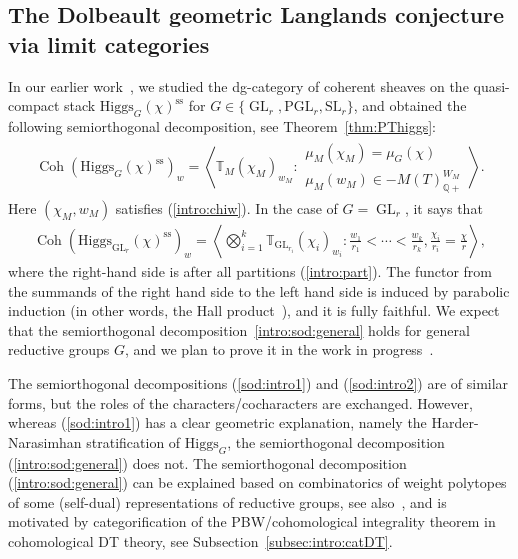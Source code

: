 \documentclass [11pt,oneside,a4paper,mathscr]{amsart}
\theoremstyle{definition}
\newcommand{\Coh}{\operatorname{Coh}}
\newcommand{\GL}{\operatorname{GL}}
\newcommand{\Hig}{\mathrm{Higgs}}
\begin{document}
\subsection{The Dolbeault geometric Langlands conjecture via limit categories}
In our earlier work~\cite{PThiggs}, we studied the dg-category of coherent sheaves on 
the quasi-compact stack $\Hig_G(\chi)^{\mathrm{ss}}$ for $G\in \{\GL_r, \mathrm{PGL}_r, \mathrm{SL}_r\}$, and obtained the following semiorthogonal decomposition, see Theorem~\ref{thm:PThiggs}:
\begin{align}\label{intro:sod:general}
    \Coh(\Hig_G(\chi)^{\mathrm{ss}})_w=
    \left\langle \mathbb{T}_{M}(\chi_{M})_{w_{M}} : \begin{array}{ll}\mu_M(\chi_M)=\mu_G(\chi) \\
     \mu_M(w_{M}) \in 
   -M(T)_{\mathbb{Q}+}^{W_{M}}\end{array}
    \right\rangle. 
\end{align}
Here $(\chi_M, w_M)$ satisfies (\ref{intro:chiw}). 
In the case of $G=\GL_r$, it says that 
\begin{align}\label{sod:intro2}
   \Coh( \Hig_{\mathrm{GL}_r}(\chi)^{\mathrm{ss}})_w=\left\langle \bigotimes_{i=1}^k \mathbb{T}_{\mathrm{GL}_{r_i}}( \chi_i)_{w_i} : \frac{w_1}{r_1}<\cdots<\frac{w_k}{r_k}, \frac{\chi_i}{r_i}=\frac{\chi}{r}  \right\rangle,  
\end{align}
where the right-hand side is after all partitions (\ref{intro:part}). The functor from the summands of the right hand side to the left hand side is induced by parabolic induction (in other words, the Hall product~\cite{PoSa, PThiggs}), and it is fully faithful. 
We expect that the semiorthogonal decomposition~\eqref{intro:sod:general} holds for general reductive groups $G$, and we plan to prove it in the work in progress~\cite{BPT}.

The semiorthogonal decompositions (\ref{sod:intro1}) and (\ref{sod:intro2}) 
are of similar forms, but the roles of the characters/cocharacters are exchanged. 
However, whereas (\ref{sod:intro1}) has a clear geometric explanation, namely the Harder-Narasimhan stratification of $\Hig_G$, the semiorthogonal decomposition (\ref{intro:sod:general}) does not. The semiorthogonal decomposition (\ref{intro:sod:general}) can be explained based on combinatorics of weight 
polytopes of some (self-dual) representations of reductive groups, see also~\cite{SpVdB}, and is motivated by categorification of the PBW/cohomological integrality theorem in cohomological DT theory, see Subsection~\ref{subsec:intro:catDT}. 
\end{document}
